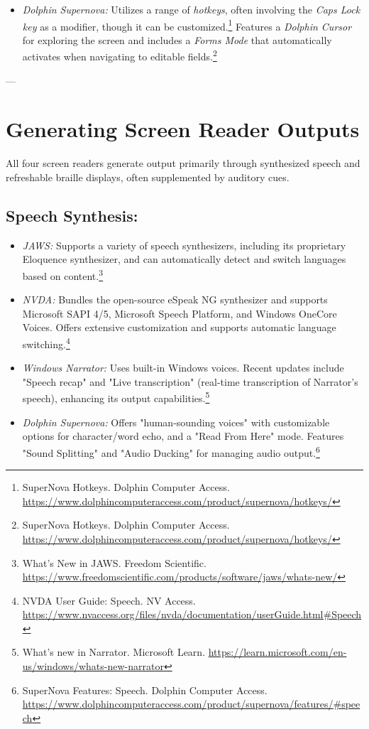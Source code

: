 \begin{itemize}
    \item \emph{Dolphin Supernova:} Utilizes a range of \emph{hotkeys}, often involving the \emph{Caps Lock key} as a modifier, though it can be customized.\footnote{SuperNova Hotkeys. Dolphin Computer Access. \url{https://www.dolphincomputeraccess.com/product/supernova/hotkeys/}} Features a \emph{Dolphin Cursor} for exploring the screen and includes a \emph{Forms Mode} that automatically activates when navigating to editable fields.\footnote{SuperNova Hotkeys. Dolphin Computer Access. \url{https://www.dolphincomputeraccess.com/product/supernova/hotkeys/}}
\end{itemize}

---

\section{Generating Screen Reader Outputs}
\label{sec:generating-outputs}

All four screen readers generate output primarily through synthesized speech and refreshable braille displays, often supplemented by auditory cues.

\subsection*{Speech Synthesis:}
\begin{itemize}
    \item \emph{JAWS:} Supports a variety of speech synthesizers, including its proprietary Eloquence synthesizer, and can automatically detect and switch languages based on content.\footnote{What's New in JAWS. Freedom Scientific. \url{https://www.freedomscientific.com/products/software/jaws/whats-new/}}
    \item \emph{NVDA:} Bundles the open-source eSpeak NG synthesizer and supports Microsoft SAPI 4/5, Microsoft Speech Platform, and Windows OneCore Voices. Offers extensive customization and supports automatic language switching.\footnote{NVDA User Guide: Speech. NV Access. \url{https://www.nvaccess.org/files/nvda/documentation/userGuide.html\#Speech}}
    \item \emph{Windows Narrator:} Uses built-in Windows voices. Recent updates include "Speech recap" and "Live transcription" (real-time transcription of Narrator's speech), enhancing its output capabilities.\footnote{What's new in Narrator. Microsoft Learn. \url{https://learn.microsoft.com/en-us/windows/whats-new-narrator}}
    \item \emph{Dolphin Supernova:} Offers "human-sounding voices" with customizable options for character/word echo, and a "Read From Here" mode. Features "Sound Splitting" and "Audio Ducking" for managing audio output.\footnote{SuperNova Features: Speech. Dolphin Computer Access. \url{https://www.dolphincomputeraccess.com/product/supernova/features/\#speech}}
\end{itemize}

